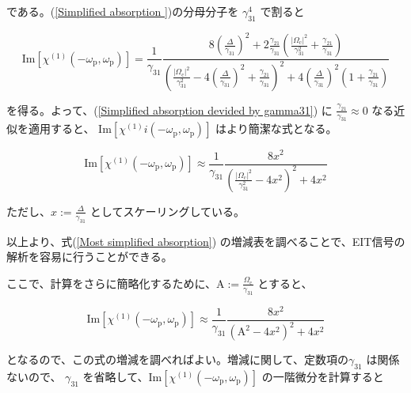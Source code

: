 \documentclass[11pt,a4paper]{ltjsarticle}
\begin{document}
である。(\ref{Simplified absorption })の分母分子を $\gamma_{31}^4$ で割ると 

\begin{equation}
\label{Simplified absorption devided by gamma31}
   \mathrm{Im} \left[\chi^{\left( 1 \right)} (- \omega_{\mathrm{p}},\omega_{\mathrm{p}}) \right] 
            = \frac{1}{\gamma_{31}} \frac{ 8 { \left( \frac{\Delta}{\gamma_{31}} \right) }^2  + 2 \frac{\gamma_{21}}{\gamma_{31}} \left( \frac{ |\Omega_{\mathrm{c}}|^2}{\gamma_{31}^2} +  \frac{\gamma_{21}}{ \gamma_{31} } \right) }{ { \left( \frac{ |\Omega_{\mathrm{c}}|^2}{\gamma_{31}^2} - 4  { \left( \frac{\Delta}{\gamma_{31}} \right) }^2 + \frac{\gamma_{21}}{ \gamma_{31}} \right) }^2 + 4 { \left( \frac{\Delta}{\gamma_{31}} \right) }^2 \left( 1 + \frac{\gamma_{21}}{\gamma_{31}} \right) }
\end{equation}

を得る。よって、(\ref{Simplified absorption devided by gamma31}) に $\frac{\gamma_{21}}{\gamma_{31}} \approx 0$ なる近似を適用すると、
$\mathrm{Im} \left[\chi^{\left( 1 \right)}i(- \omega_{\mathrm{p}},\omega_{\mathrm{p}}) \right]$ はより簡潔な式となる。


\begin{equation}
\label{Most simplified absorption}
   \mathrm{Im} \left[\chi^{\left( 1 \right)} (- \omega_{\mathrm{p}},\omega_{\mathrm{p}}) \right] 
            \approx \frac{1}{\gamma_{31}}  \frac{ 8 x^2  }{ { \left( \frac{ {|\Omega_{\mathrm{c}}|^2}}{\gamma_{31}^2} - 4 x^2 \right) }^2 + 4 x^2}
\end{equation}

ただし、$x := \frac{\Delta}{\gamma_{31}}$ としてスケーリングしている。

以上より、式(\ref{Most simplified absorption}) の増減表を調べることで、EIT信号の解析を容易に行うことができる。

ここで、計算をさらに簡略化するために、$\mathrm{A} := \frac{\Omega_{\mathrm{c}}}{\gamma_{31}}$ とすると、

\begin{equation}
\label{Most simplified absorption 2}
   \mathrm{Im} \left[\chi^{\left( 1 \right)} (- \omega_{\mathrm{p}},\omega_{\mathrm{p}}) \right] 
            \approx \frac{1}{\gamma_{31}}  \frac{ 8 x^2  }{ { \left( \mathrm{A}^2 - 4 x^2 \right) }^2 + 4 x^2}
\end{equation}

となるので、この式の増減を調べればよい。増減に関して、定数項の$\gamma_{31}$ は関係ないので、
$\gamma_{31}$ を省略して、$\mathrm{Im} \left[\chi^{\left( 1 \right)} (- \omega_{\mathrm{p}},\omega_{\mathrm{p}}) \right]$
の一階微分を計算すると
\end{document}
